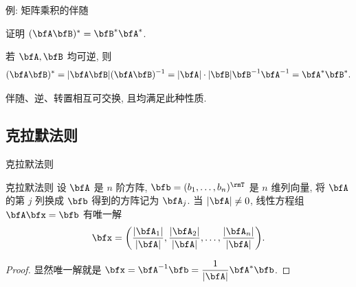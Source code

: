 \begin{frame}{例: 矩阵乘积的伴随}
	\onslide<+->
	\begin{example}
		证明 $(\bfA\bfB)^*=\bfB^*\bfA^*$.
	\end{example}
	\begin{proof*}
		若 $\bfA,\bfB$ 均可逆, 则
		\[(\bfA\bfB)^*=|\bfA\bfB|(\bfA\bfB)^{-1}=|\bfA|\cdot|\bfB|\bfB^{-1}\bfA^{-1}=\bfA^*\bfB^*.\]

		
	\end{proof*}
	\onslide<+->
	\alert{伴随、逆、转置相互可交换, 且均满足此种性质.}
\end{frame}


\subsection{克拉默法则}

\begin{frame}{克拉默法则}
	\onslide<+->
	\begin{algorithm}{克拉默法则}
		设 $\bfA$ 是 $n$ 阶方阵, $\bfb=(b_1,\dots,b_n)^\rmT$ 是 $n$ 维列向量,
		将 $\bfA$ 的第 $j$ 列换成 $\bfb$ 得到的方阵记为 $\bfA_j$.
		当 $|\bfA|\neq 0$, 线性方程组 $\bfA\bfx=\bfb$ 有唯一解
		\[\bfx=\biggl(\frac{|\bfA_1|}{|\bfA|},\frac{|\bfA_2|}{|\bfA|},\dots,\frac{|\bfA_n|}{|\bfA|}\biggr).\]
	\end{algorithm}
	\onslide<+->
	\begin{proof}
		显然唯一解就是 $\bfx=\bfA^{-1}\bfb=\dfrac1{|\bfA|}\bfA^*\bfb$.
		\onslide<+->{%
			因此 $\bfA^*\bfb=(|\bfA_1|,\dots,|\bfA_n|)^\rmT$, 从而 $\bfx$ 具有题述形式.\qedhere
		}
	\end{proof}
\end{frame}


